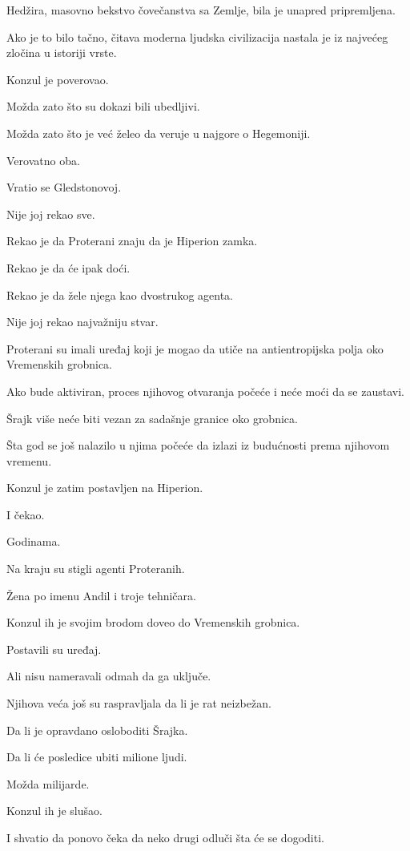 Hedžira, masovno bekstvo čovečanstva sa Zemlje, bila je unapred pripremljena.

Ako je to bilo tačno, čitava moderna ljudska civilizacija nastala je iz najvećeg zločina u istoriji vrste.

Konzul je poverovao.

Možda zato što su dokazi bili ubedljivi.

Možda zato što je već želeo da veruje u najgore o Hegemoniji.

Verovatno oba.

\bigskip

Vratio se Gledstonovoj.

Nije joj rekao sve.

Rekao je da Proterani znaju da je Hiperion zamka.

Rekao je da će ipak doći.

Rekao je da žele njega kao dvostrukog agenta.

Nije joj rekao najvažniju stvar.

Proterani su imali uređaj koji je mogao da utiče na antientropijska polja oko Vremenskih grobnica.

Ako bude aktiviran, proces njihovog otvaranja počeće i neće moći da se zaustavi.

Šrajk više neće biti vezan za sadašnje granice oko grobnica.

Šta god se još nalazilo u njima počeće da izlazi iz budućnosti prema njihovom vremenu.

Konzul je zatim postavljen na Hiperion.

I čekao.

Godinama.

\bigskip

Na kraju su stigli agenti Proteranih.

Žena po imenu Andil i troje tehničara.

Konzul ih je svojim brodom doveo do Vremenskih grobnica.

Postavili su uređaj.

Ali nisu nameravali odmah da ga uključe.

Njihova veća još su raspravljala da li je rat neizbežan.

Da li je opravdano osloboditi Šrajka.

Da li će posledice ubiti milione ljudi.

Možda milijarde.

Konzul ih je slušao.

I shvatio da ponovo čeka da neko drugi odluči šta će se dogoditi.

